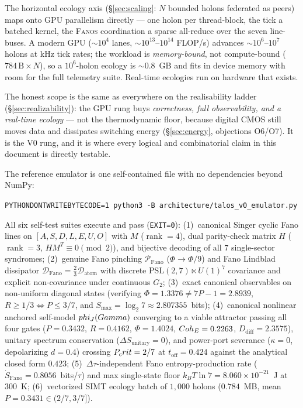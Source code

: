 \begin{claimbox}
The horizontal ecology axis (\S\ref{sec:scaling}: $N$ bounded holons federated
as peers) maps onto GPU parallelism directly --- one holon per thread-block, the
tick a batched kernel, the \textsc{Fanos} coordination a sparse all-reduce over
the seven line-buses. A modern GPU (${\sim}10^4$ lanes, ${\sim}10^{13}$--$10^{14}$
FLOP/s) advances ${\sim}10^{6}$--$10^{7}$ holons at kHz tick rates; the workload
is \emph{memory-bound}, not compute-bound ($784\,\mathrm{B}\times N$), so a
$10^{6}$-holon ecology is ${\sim}0.8$~GB and fits in device memory with room for
the full telemetry suite. Real-time ecologies run on hardware that exists.
\end{claimbox}

\noindent The honest scope is the same as everywhere on the realisability ladder
(\S\ref{sec:realizability}): the GPU rung buys \emph{correctness, full
observability, and a real-time ecology} --- not the thermodynamic floor, because
digital CMOS still moves data and dissipates switching energy
(\S\ref{sec:energy}, objections O6/O7). It is the V0 rung, and it is where
every logical and combinatorial claim in this document is directly testable.

\begin{trybox}
The reference emulator is one self-contained file with no dependencies beyond NumPy:
\begin{center}\texttt{PYTHONDONTWRITEBYTECODE=1 python3 -B architecture/talos\_v0\_emulator.py}\end{center}
All six self-test suites execute and pass (\texttt{EXIT=0}):
(1)~canonical Singer cyclic Fano lines on $[A,S,D,L,E,U,O]$ with $M$ ($\operatorname{rank}=4$),
dual parity-check matrix $H$ ($\operatorname{rank}=3$, $HM^T\equiv 0\pmod 2$), and
bijective decoding of all $7$ single-sector syndromes;
(2)~genuine Fano pinching $\mathcal{P}_{\mathrm{Fano}}$ ($\Phi\to\Phi/9$) and
Fano Lindblad dissipator $\mathcal{D}_{\mathrm{Fano}}=\tfrac23\mathcal{D}_{\mathrm{atom}}$
with discrete $\mathrm{PSL}(2,7)\ltimes U(1)^7$ covariance and explicit
non-covariance under continuous $G_2$;
(3)~exact canonical observables on non-uniform diagonal states (verifying
$\Phi=1.3376\neq 7P-1=2.8939$, $R\ge 1/3\Leftrightarrow P\le 3/7$, and
$S_{\max}=\log_2 7\approx 2.807355$~bits);
(4)~canonical nonlinear anchored self-model $phi_J(Gamma)$ converging to a
viable attractor passing all four gates ($P=0.3432$, $R=0.4162$, $\Phi=1.4024$,
$Coh_E=0.2263$, $D_{\mathrm{diff}}=2.3575$), unitary spectrum conservation
($\Delta S_{\mathrm{unitary}}=0$), and power-port severance ($\kappa=0$,
depolarizing $d=0.4$) crossing $P_crit=2/7$ at $t_{\mathrm{off}}=0.424$ against
the analytical closed form $0.423$;
(5)~$\Delta\tau$-independent Fano entropy-production rate
($\dot S_{\mathrm{Fano}}=0.8056$~bits/$\tau$) and max single-state floor
$k_BT\ln 7=8.060\times 10^{-21}$~J at $300$~K;
(6)~vectorized SIMT ecology batch of $1{,}000$ holons ($0.784$~MB, mean
$P=0.3431\in(2/7,3/7]$).
\end{trybox}

